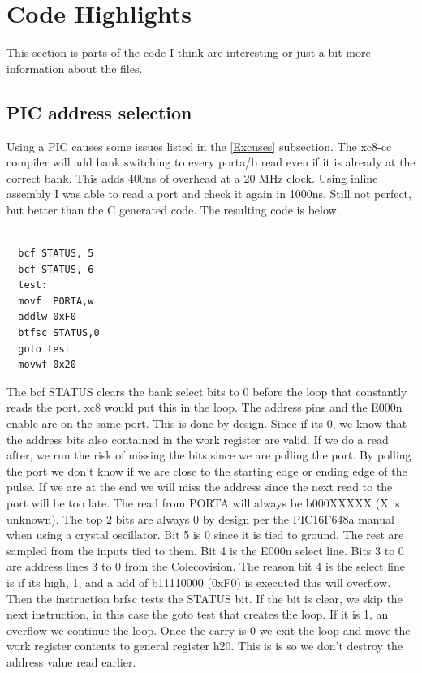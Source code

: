 \documentclass{article}
\begin{document}
  \newpage

  \section{Code Highlights}

  \par
  This section is parts of the code I think are interesting or just a bit more information about the files.

  \subsection{PIC address selection} \label{PIC address selection}

  \par
  Using a PIC causes some issues listed in the \ref{Excuses} subsection. The xc8-cc compiler will add bank switching to every porta/b read even if
  it is already at the correct bank. This adds 400ns of overhead at a 20 MHz clock. Using inline assembly I was able to read a port and check it again
  in 1000ns. Still not perfect, but better than the C generated code. The resulting code is below.

  \begin{lstlisting}[language={[xc8]Assembler}]

  bcf STATUS, 5
  bcf STATUS, 6
  test:
  movf  PORTA,w
  addlw 0xF0
  btfsc STATUS,0
  goto test
  movwf 0x20
  \end{lstlisting}

  \par
  The bcf STATUS clears the bank select bits to 0 before the loop that constantly reads the port. xc8 would put this in the loop.
  The address pins and the E000n enable are on the same port. This is done by design. Since if its 0, we know that the address bits
  also contained in the work register are valid. If we do a read after, we run the risk of missing the bits since we are polling the port.
  By polling the port we don't know if we are close to the starting edge or ending edge of the pulse. If we are at the end we will miss the
  address since the next read to the port will be too late. The read from PORTA will always be b000XXXXX (X is unknown). The top 2 bits
  are always 0 by design per the PIC16F648a manual when using a crystal oscillator. Bit 5 is 0 since it is tied to ground. The rest are sampled
  from the inputs tied to them. Bit 4 is the E000n select line. Bits 3 to 0 are address lines 3 to 0 from the Colecovision. The reason bit 4 is
  the select line is if its high, 1, and a add of b11110000 (0xF0) is executed this will overflow. Then the instruction brfsc tests the STATUS bit.
  If the bit is clear, we skip the next instruction, in this case the goto test that creates the loop. If it is 1, an overflow we continue the
  loop. Once the carry is 0 we exit the loop and move the work register contents to general register h20. This is is so we don't destroy the
  address value read earlier.
\end{document}
